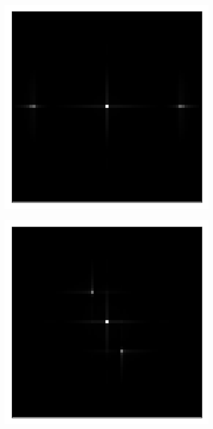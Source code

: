 \begin{figure}[h]
	\begin{subfigure}[t]{0.3\textwidth}
		\centering
		\includegraphics[width=\linewidth]{images/fringes_1_ft_kx_25_ky_0.png}
		\caption{}
		\label{fig:fringes_moire_ft_kx_40_ky_0}
	\end{subfigure}
	\begin{subfigure}[t]{0.3\textwidth}
		\centering
		\includegraphics[width=\linewidth]{images/fringes_2_ft_kx_5_ky_10.png}

\end{subfigure}
\end{figure}
